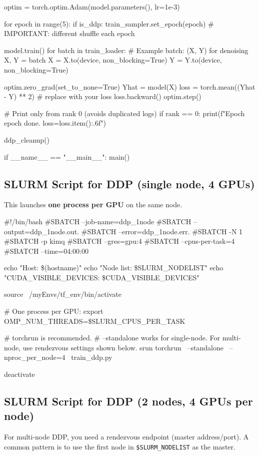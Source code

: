 \documentclass[11pt]{article}
\begin{document}
\begin{codeblock}[language=python,caption={Minimal PyTorch DDP training skeleton (\texttt{train\_ddp.py})}]
    optim = torch.optim.Adam(model.parameters(), lr=1e-3)

    for epoch in range(5):
        if is_ddp:
            train_sampler.set_epoch(epoch)  # IMPORTANT: different shuffle each epoch

        model.train()
        for batch in train_loader:
            # Example batch: (X, Y) for denoising
            X, Y = batch
            X = X.to(device, non_blocking=True)
            Y = Y.to(device, non_blocking=True)

            optim.zero_grad(set_to_none=True)
            Yhat = model(X)
            loss = torch.mean((Yhat - Y) ** 2)  # replace with your loss
            loss.backward()
            optim.step()

        # Print only from rank 0 (avoids duplicated logs)
        if rank == 0:
            print(f"Epoch {epoch} done. loss={loss.item():.6f}")

    ddp_cleanup()

if __name__ == "__main__":
    main()
\end{codeblock}

\subsection{SLURM Script for DDP (single node, 4 GPUs)}
This launches \textbf{one process per GPU} on the same node.

\begin{codeblock}[caption={SLURM script for DDP on 1 node (\texttt{ddp\_1node.slurm})}]
#!/bin/bash
#SBATCH --job-name=ddp_1node
#SBATCH --output=ddp_1node.out.%
#SBATCH --error=ddp_1node.err.%
#SBATCH -N 1
#SBATCH -p kimq
#SBATCH --gres=gpu:4
#SBATCH --cpus-per-task=4
#SBATCH --time=04:00:00

echo "Host: \$(hostname)"
echo "Node list: \$SLURM_NODELIST"
echo "CUDA_VISIBLE_DEVICES: \$CUDA_VISIBLE_DEVICES"

source ~/myEnvs/tf_env/bin/activate

# One process per GPU:
export OMP_NUM_THREADS=\$SLURM_CPUS_PER_TASK

# torchrun is recommended.
# --standalone works for single-node. For multi-node, use rendezvous settings shown below.
srun torchrun \
  --standalone \
  --nproc_per_node=4 \
  train_ddp.py

deactivate
\end{codeblock}

\subsection{SLURM Script for DDP (2 nodes, 4 GPUs per node)}
For multi-node DDP, you need a rendezvous endpoint (master address/port).
A common pattern is to use the first node in \texttt{\$SLURM\_NODELIST} as the master.
\end{document}
